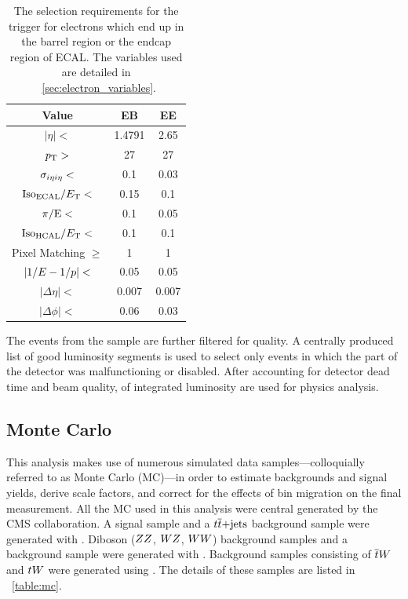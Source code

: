 \begin{table}[h]
\centering
\begin{center}
    \begin{tabular}{ | c | c c |} \hline
        Value                      & EB     & EE     \\ \hline
        $|\eta| <$                 & 1.4791 & 2.65   \\
        $p_{\mathrm{T}} >$                    & 27     & 27     \\
        $\sigma_{i \eta i \eta} <$         & 0.1    & 0.03   \\
        $\text{Iso}_{\text{ECAL}} / E_{\mathrm{T}} <$         & 0.15   & 0.1    \\
        $\pi/\mathrm{E} <$                & 0.1    & 0.05   \\
        $\text{Iso}_{\text{HCAL}} / E_{\mathrm{T}} <$         & 0.1    & 0.1    \\
        Pixel Matching $\ge$       & 1      & 1      \\
        $|1/E - 1/p| <$              & 0.05   & 0.05   \\
        $|\Delta \eta| <$          & 0.007  & 0.007  \\
        $|\Delta \phi| <$          & 0.06   & 0.03   \\ \hline
    \end{tabular}
\end{center}
\caption{
    The selection requirements for the \SingleElectronTrigger trigger for
    electrons which end up in the barrel region or the endcap region of ECAL.
    The variables used are detailed in \SEC~\ref{sec:electron_variables}.
}
\label{table:wp80}
\end{table}

The events from the \SingleElectron sample are further filtered for quality. A
centrally produced list of good luminosity segments is used to select only
events in which the part of the detector was malfunctioning or disabled. After
accounting for detector dead time and beam quality, \GoodLumiNumber of
integrated luminosity are used for physics analysis.

\subsection{Monte Carlo}
\label{ssec:monte_carlo}

This analysis makes use of numerous simulated data samples---colloquially
referred to as Monte Carlo (MC)---in order to estimate backgrounds and signal
yields, derive scale factors, and correct for the effects of bin migration on
the final measurement. All the MC used in this analysis were central generated
by the CMS collaboration. A \DYtoll signal sample and a $t\overline{t}\text{+jets}$
background sample were generated with \MADGRAPH \cite{alwall2014}. Diboson
($ZZ$, $WZ$, $WW$) background samples and a \DYtotautau background sample
were generated with \PYTHIA \cite{sjostran2006}. Background samples consisting
of $\overline{t} W$ and $t W$ were generated using \POWHEG
\cite{nason2004}\cite{alioli2010}\cite{re2011}. The details of these samples
are listed in \TAB~\ref{table:mc}.

